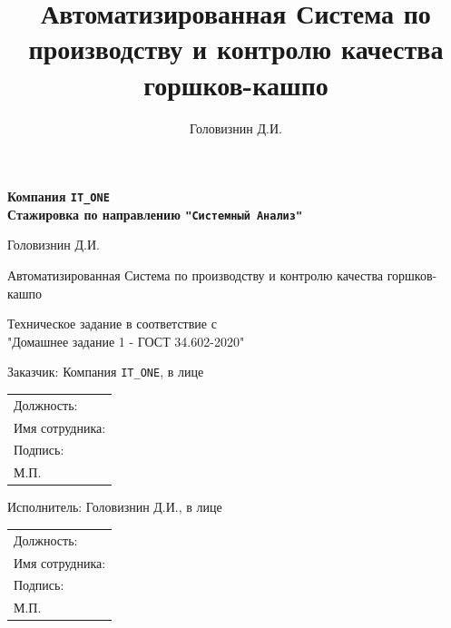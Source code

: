 \documentclass[16pt,a4paper]{article}
\begin{document}
\pagestyle{fancy}
\title{Автоматизированная Система по производству и контролю качества горшков-кашпо}
\author{Головизнин Д.И.}
\begin{titlepage}
    \newpage
    \begin{center}
    {\bfseries Компания \verb|IT_ONE| \\
    Стажировка по направлению \verb|"Системный Анализ"|}
    \vspace{1cm}
    \vspace{6em}




     Головизнин Д.И. \\
    \end{center}

    \vspace{1.2em}

    \begin{center}
    \Large Автоматизированная Система по производству и контролю качества \linebreak
    горшков-кашпо
    \end{center}

    \vspace{5em}

    \begin{center}
    Техническое задание в соответствие с\\
     "Домашнее задание 1 - ГОСТ 34.602-2020"
     \end{center}
    \vspace{6em}

\begin{flushright} %
Заказчик: Компания \verb|IT_ONE|, в лице
\begin{tabular}{p{}} %
Должность: \hrulefill \\ %
Имя сотрудника: \hrulefill \\
Подпись: \hrulefill \\
М.П.
\end{tabular}
\vspace{3em}

Исполнитель: Головизнин Д.И., в лице
\begin{tabular}{p{}} %
Должность: \hrulefill \\ %
Имя сотрудника: \hrulefill \\
Подпись: \hrulefill \\
М.П.
\end{tabular}
\end{flushright}



\end{titlepage}
\end{document}
